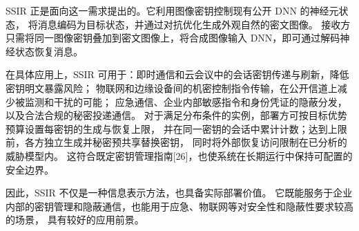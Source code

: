 SSIR 正是面向这一需求提出的。它利用图像密钥控制现有公开 DNN 的神经元状态，
将消息编码为目标状态，并通过对抗优化生成外观自然的密文图像。
接收方只需将同一图像密钥叠加到密文图像上，将合成图像输入 DNN，即可通过解码神经状态恢复消息。

在具体应用上，SSIR 可用于：即时通信和云会议中的会话密钥传递与刷新，降低密钥明文暴露风险；
物联网和边缘设备间的机密控制指令传输，在公开信道上减少被监测和干扰的可能；
应急通信、企业内部敏感指令和身份凭证的隐蔽分发，以及合法合规的秘密投递通信。
对于满足分布条件的实例，部署方可按目标优势预算设置每密钥的生成与恢复上限，
并在同一密钥的会话中累计计数；达到上限前，各方独立生成并秘密预共享替换密钥，
同时将外部恢复访问限制在已分析的威胁模型内。
这符合既定密钥管理指南[26]，也使系统在长期运行中保持可配置的安全边界。

因此，SSIR 不仅是一种信息表示方法，也具备实际部署价值。
它既能服务于企业内部的密钥管理和隐蔽通信，也能用于应急、物联网等对安全性和隐蔽性要求较高的场景，
具有较好的应用前景。

